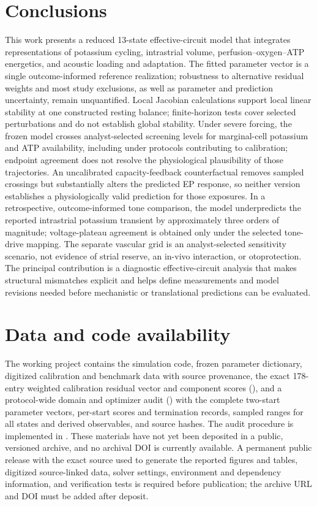 \documentclass[final,5p,times]{elsarticle}
\begin{document}
\section{Conclusions}\label{sec:conclusions}

This work presents a reduced 13-state effective-circuit model that integrates representations of potassium cycling, intrastrial volume, perfusion--oxygen--ATP energetics, and acoustic loading and adaptation. The fitted parameter vector is a single outcome-informed reference realization; robustness to alternative residual weights and most study exclusions, as well as parameter and prediction uncertainty, remain unquantified. Local Jacobian calculations support local linear stability at one constructed resting balance; finite-horizon tests cover selected perturbations and do not establish global stability. Under severe forcing, the frozen model crosses analyst-selected screening levels for marginal-cell potassium and ATP availability, including under protocols contributing to calibration; endpoint agreement does not resolve the physiological plausibility of those trajectories. An uncalibrated capacity-feedback counterfactual removes sampled crossings but substantially alters the predicted EP response, so neither version establishes a physiologically valid prediction for those exposures. In a retrospective, outcome-informed tone comparison, the model underpredicts the reported intrastrial potassium transient by approximately three orders of magnitude; voltage-plateau agreement is obtained only under the selected tone-drive mapping. The separate vascular grid is an analyst-selected sensitivity scenario, not evidence of strial reserve, an in-vivo interaction, or otoprotection. The principal contribution is a diagnostic effective-circuit analysis that makes structural mismatches explicit and helps define measurements and model revisions needed before mechanistic or translational predictions can be evaluated.

\section*{Data and code availability}\label{sec:data-availability}
The working project contains the simulation code, frozen parameter dictionary, digitized calibration and benchmark data with source provenance, the exact 178-entry weighted calibration residual vector and component scores (), and a protocol-wide domain and optimizer audit () with the complete two-start parameter vectors, per-start scores and termination records, sampled ranges for all states and derived observables, and source hashes. The audit procedure is implemented in . These materials have not yet been deposited in a public, versioned archive, and no archival DOI is currently available. A permanent public release with the exact source used to generate the reported figures and tables, digitized source-linked data, solver settings, environment and dependency information, and verification tests is required before publication; the archive URL and DOI must be added after deposit.
\end{document}
